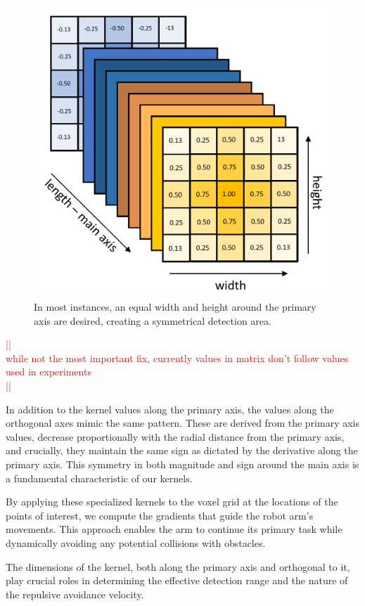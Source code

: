 \documentclass[a4paper]{article}
\newcommand\todocomment[1]{\textcolor{red}{||\\ #1\\||}}
\begin{document}
\begin{figure}[H]
	\centering
	\includegraphics[width=0.85\linewidth]{kernel-matrix.png}
	\caption{In most instances, an equal width and height around the primary axis are desired, creating a symmetrical detection area.} 
	\label{Kernel matrix}
\end{figure}

\todocomment{while not the most important fix, currently values in matrix don't follow values used in experiments}


In addition to the kernel values along the primary axis, the values along the orthogonal axes mimic the same pattern. These are derived from the primary axis values, decrease proportionally with the radial distance from the primary axis, and crucially, they maintain the same sign as dictated by the derivative along the primary axis. This symmetry in both magnitude and sign around the main axis is a fundamental characteristic of our kernels.

By applying these specialized kernels to the voxel grid at the locations of the points of interest, we compute the gradients that guide the robot arm's movements. This approach enables the arm to continue its primary task while dynamically avoiding any potential collisions with obstacles.

The dimensions of the kernel, both along the primary axis and orthogonal to it, play crucial roles in determining the effective detection range and the nature of the repulsive avoidance velocity.
\end{document}
